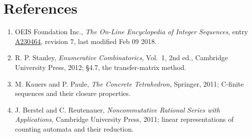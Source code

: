 \documentclass[11pt]{article}
\theoremstyle{definition}
\begin{document}
\section{References}

\begin{enumerate}

\item OEIS Foundation Inc., \emph{The On-Line Encyclopedia of Integer Sequences}, entry \href{https://oeis.org/A230464}{A230464}, revision 7, last modified Feb 09 2018.

\item R. P. Stanley, \emph{Enumerative Combinatorics}, Vol.~1, 2nd ed., Cambridge University Press, 2012; \S4.7, the transfer-matrix method.

\item M. Kauers and P. Paule, \emph{The Concrete Tetrahedron}, Springer, 2011; C-finite sequences and their closure properties.

\item J. Berstel and C. Reutenauer, \emph{Noncommutative Rational Series with Applications}, Cambridge University Press, 2011; linear representations of counting automata and their reduction.

\end{enumerate}
\end{document}

